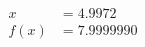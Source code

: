 \documentclass[preview]{standalone}
\begin{document}
\begin{align*}
x &= 4.9972\\f(x) &= 7.9999990
\end{align*}
\end{document}
